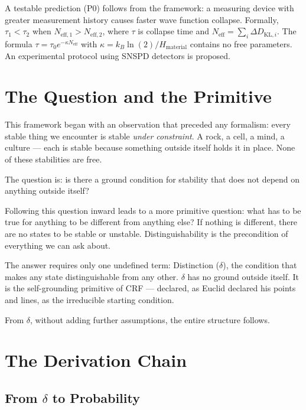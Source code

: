\documentclass[12pt]{article}
\begin{document}
A testable prediction (P0) follows from the framework: a measuring
device with greater measurement history causes faster wave function
collapse. Formally, $\tau_1 < \tau_2$ when $N_{\mathrm{eff},1} >
N_{\mathrm{eff},2}$, where $\tau$ is collapse time and
$N_{\mathrm{eff}} = \sum_i \Delta D_{\mathrm{KL},i}$. The formula
$\tau = \tau_0 e^{-\kappa N_{\mathrm{eff}}}$ with
$\kappa = k_B\ln(2)/H_{\mathrm{material}}$ contains no free
parameters. An experimental protocol using SNSPD detectors is
proposed.

\bigskip
\tableofcontents
\newpage

\section{The Question and the Primitive}

This framework began with an observation that preceded any formalism:
every stable thing we encounter is stable \textit{under constraint}.
A rock, a cell, a mind, a culture --- each is stable because something
outside itself holds it in place. None of these stabilities are free.

The question is: is there a ground condition for stability that does
not depend on anything outside itself?

Following this question inward leads to a more primitive question:
what has to be true for anything to be different from anything else?
If nothing is different, there are no states to be stable or unstable.
Distinguishability is the precondition of everything we can ask about.

The answer requires only one undefined term: Distinction ($\delta$),
the condition that makes any state distinguishable from any other.
$\delta$ has no ground outside itself. It is the self-grounding
primitive of CRF --- declared, as Euclid declared his points and
lines, as the irreducible starting condition.

From $\delta$, without adding further assumptions, the entire
structure follows.

\section{The Derivation Chain}

\subsection{From $\delta$ to Probability}
\end{document}
